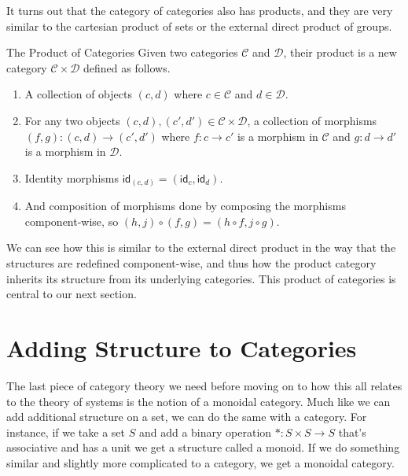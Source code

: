 \documentclass[12pt]{article}
\begin{document}
It turns out that the category of categories also has products, and they are very similar to the cartesian product of sets or the external direct product of groups.

\begin{definition}{The Product of Categories}{}
    Given two categories $\mathcal{C}$ and $\mathcal{D}$, their product is a new category $\mathcal{C} \times \mathcal{D}$ defined as follows.
    \begin{enumerate}
        \item A collection of objects $(c, d)$ where $c\in\mathcal{C}$ and $d\in\mathcal{D}$.
        \item For any two objects $(c,d), (c',d') \in \mathcal{C} \times \mathcal{D}$, a collection of morphisms \\ $(f,g): (c,d) \rightarrow (c',d')$ where $f:c \rightarrow c'$ is a morphism in $\mathcal{C}$ and $g: d \rightarrow d'$ is a morphism in $\mathcal{D}$.
        \item Identity morphisms $\mathsf{id}_{(c,d)} = (\mathsf{id}_c, \mathsf{id}_d)$.
        \item And composition of morphisms done by composing the morphisms component-wise, so $(h,j) \circ (f,g) = (h\circ f, j \circ g)$.
    \end{enumerate}
\end{definition}

We can see how this is similar to the external direct product in the way that the structures are redefined component-wise, and thus how the product category inherits its structure from its underlying categories.
This product of categories is central to our next section.


\section*{Adding Structure to Categories}
The last piece of category theory we need before moving on to how this all relates to the theory of systems is the notion of a monoidal category.
Much like we can add additional structure on a set, we can do the same with a category.
For instance, if we take a set $S$ and add a binary operation $*:S \times S \rightarrow S$ that's associative and has a unit we get a structure called a monoid.
If we do something similar and slightly more complicated to a category, we get a monoidal category.
\end{document}
